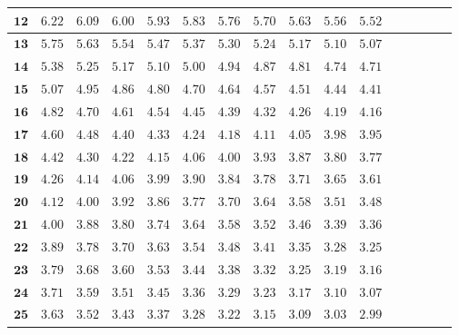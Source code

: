 \begin{longtable}{|r|r|r|r|r|r|r|r|r|r|r|r|r|r|r|r|}
    \(\mathbf{12}\) & \(6.22\)  & \(6.09\)  & \(6.00\)  & \(5.93\)  & \(5.83\)  & \(5.76\)  & \(5.70\)  & \(5.63\)  & \(5.56\)  & \(5.52\) \\ \hline 
    \(\mathbf{13}\) & \(5.75\)  & \(5.63\)  & \(5.54\)  & \(5.47\)  & \(5.37\)  & \(5.30\)  & \(5.24\)  & \(5.17\)  & \(5.10\)  & \(5.07\) \\ \hline 
    \(\mathbf{14}\) & \(5.38\)  & \(5.25\)  & \(5.17\)  & \(5.10\)  & \(5.00\)  & \(4.94\)  & \(4.87\)  & \(4.81\)  & \(4.74\)  & \(4.71\) \\ \hline 
    \(\mathbf{15}\) & \(5.07\)  & \(4.95\)  & \(4.86\)  & \(4.80\)  & \(4.70\)  & \(4.64\)  & \(4.57\)  & \(4.51\)  & \(4.44\)  & \(4.41\) \\ \hline 
    \(\mathbf{16}\) & \(4.82\)  & \(4.70\)  & \(4.61\)  & \(4.54\)  & \(4.45\)  & \(4.39\)  & \(4.32\)  & \(4.26\)  & \(4.19\)  & \(4.16\) \\ \hline 
    \(\mathbf{17}\) & \(4.60\)  & \(4.48\)  & \(4.40\)  & \(4.33\)  & \(4.24\)  & \(4.18\)  & \(4.11\)  & \(4.05\)  & \(3.98\)  & \(3.95\) \\ \hline 
    \(\mathbf{18}\) & \(4.42\)  & \(4.30\)  & \(4.22\)  & \(4.15\)  & \(4.06\)  & \(4.00\)  & \(3.93\)  & \(3.87\)  & \(3.80\)  & \(3.77\) \\ \hline 
    \(\mathbf{19}\) & \(4.26\)  & \(4.14\)  & \(4.06\)  & \(3.99\)  & \(3.90\)  & \(3.84\)  & \(3.78\)  & \(3.71\)  & \(3.65\)  & \(3.61\) \\ \hline 
    \(\mathbf{20}\) & \(4.12\)  & \(4.00\)  & \(3.92\)  & \(3.86\)  & \(3.77\)  & \(3.70\)  & \(3.64\)  & \(3.58\)  & \(3.51\)  & \(3.48\) \\ \hline 
    \(\mathbf{21}\) & \(4.00\)  & \(3.88\)  & \(3.80\)  & \(3.74\)  & \(3.64\)  & \(3.58\)  & \(3.52\)  & \(3.46\)  & \(3.39\)  & \(3.36\) \\ \hline 
    \(\mathbf{22}\) & \(3.89\)  & \(3.78\)  & \(3.70\)  & \(3.63\)  & \(3.54\)  & \(3.48\)  & \(3.41\)  & \(3.35\)  & \(3.28\)  & \(3.25\) \\ \hline 
    \(\mathbf{23}\) & \(3.79\)  & \(3.68\)  & \(3.60\)  & \(3.53\)  & \(3.44\)  & \(3.38\)  & \(3.32\)  & \(3.25\)  & \(3.19\)  & \(3.16\) \\ \hline 
    \(\mathbf{24}\) & \(3.71\)  & \(3.59\)  & \(3.51\)  & \(3.45\)  & \(3.36\)  & \(3.29\)  & \(3.23\)  & \(3.17\)  & \(3.10\)  & \(3.07\) \\ \hline 
    \(\mathbf{25}\) & \(3.63\)  & \(3.52\)  & \(3.43\)  & \(3.37\)  & \(3.28\)  & \(3.22\)  & \(3.15\)  & \(3.09\)  & \(3.03\)  & \(2.99\) \\ \hline 

\end{longtable}
